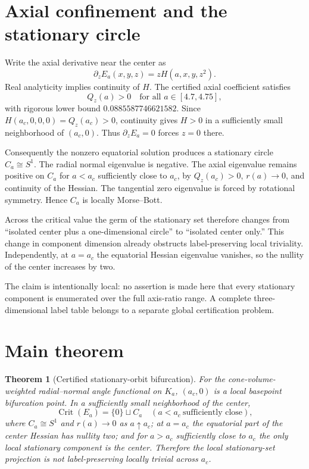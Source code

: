 \documentclass[11pt]{article}
\newtheorem{theorem}{Theorem}[section]
\begin{document}
\section{Axial confinement and the stationary circle}
Write the axial derivative near the center as
\[
\partial_zE_a(x,y,z)=zH(a,x,y,z^2).
\]
Real analyticity implies continuity of $H$. The certified axial coefficient satisfies
\[
Q_z(a)>0\quad\text{for all }a\in[4.7,4.75],
\]
with rigorous lower bound $0.0885587746621582$. Since $H(a_c,0,0,0)=Q_z(a_c)>0$, continuity gives $H>0$ in a sufficiently small neighborhood of $(a_c,0)$. Thus $\partial_zE_a=0$ forces $z=0$ there.

Consequently the nonzero equatorial solution produces a stationary circle $C_a\cong S^1$. The radial normal eigenvalue is negative. The axial eigenvalue remains positive on $C_a$ for $a<a_c$ sufficiently close to $a_c$, by $Q_z(a_c)>0$, $r(a)\to0$, and continuity of the Hessian. The tangential zero eigenvalue is forced by rotational symmetry. Hence $C_a$ is locally Morse--Bott.

Across the critical value the germ of the stationary set therefore changes from ``isolated center plus a one-dimensional circle'' to ``isolated center only.'' This change in component dimension already obstructs label-preserving local triviality. Independently, at $a=a_c$ the equatorial Hessian eigenvalue vanishes, so the nullity of the center increases by two.

The claim is intentionally local: no assertion is made here that every stationary component is enumerated over the full axis-ratio range. A complete three-dimensional label table belongs to a separate global certification problem.

\section{Main theorem}
\begin{theorem}[Certified stationary-orbit bifurcation]\label{thm:main}
For the cone-volume-weighted radial--normal angle functional on $K_a$, $(a_c,0)$ is a local basepoint bifurcation point. In a sufficiently small neighborhood of the center,
\[
\operatorname{Crit}(E_a)=\{0\}\sqcup C_a\quad(a<a_c\ \text{sufficiently close}),
\]
where $C_a\cong S^1$ and $r(a)\to0$ as $a\uparrow a_c$; at $a=a_c$ the equatorial part of the center Hessian has nullity two; and for $a>a_c$ sufficiently close to $a_c$ the only local stationary component is the center. Therefore the local stationary-set projection is not label-preserving locally trivial across $a_c$.
\end{theorem}
\end{document}
